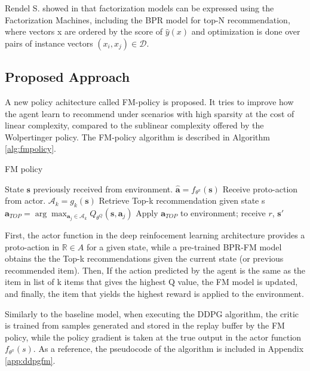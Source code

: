 Rendel S. showed in \cite{rendle2012factorization} that factorization models can be expressed using the Factorization Machines, including the BPR model for top-N recommendation, where vectors x are ordered by the score of $\hat{y}(x)$ and optimization is done over pairs of instance vectors $(x_i, x_j) \in \mathcal{D}$.

\subsection{Proposed Approach}

A new policy achitecture called FM-policy is proposed. It tries to improve how the agent learn to recommend under scenarios with high sparsity at the cost of linear complexity, compared to the sublinear complexity offered by the Wolpertinger policy. The FM-policy algorithm is described in Algorithm \ref{alg:fmpolicy}.

\begin{center}
 \begin{algorithm}[!htbp]
    \SetAlgoLined\DontPrintSemicolon
    \caption{FM policy}
    \label{alg:fmpolicy}
    
    State $\mathbf{s}$ previously received from environment.\;
    $\hat{\mathbf{a}} = f_{\theta^{\pi}}(\mathbf{s})$ {Receive proto-action from actor}.\;
    $\mathcal{A}_k = g_k(\mathbf{s})$ {Retrieve Top-k recommendation given state s}\;
    $\mathbf{a}_{TOP} = \arg \max_{\mathbf{a}_j \in \mathcal{A}_k} Q_{\theta^{Q}}(\mathbf{s}, \mathbf{a}_j)$\;
    Apply $\mathbf{a}_{TOP}$ to environment; receive $r$, $\mathbf{s}'$\;
  \end{algorithm}
\end{center}

First, the actor function in the deep reinfocement learning architecture provides a proto-action in $\mathbb{R} \in {A}$ for a given state, while a pre-trained BPR-FM model obtains the the Top-k recommendations given the current state (or previous recommended item). Then, If the action predicted by the agent is the same as the item in list of k items that gives the highest Q value, the FM model is updated, and finally, the item that yields the highest reward is applied to the environment.

Similarly to the baseline model, when executing the DDPG algorithm, the critic is trained from samples generated and stored in the replay buffer by the FM policy, while the policy gradient is taken at the true output in the actor function $f_{\theta^{\pi}}(s)$. As a reference, the pseudocode of the algorithm is included in Appendix \ref{app:ddpgfm}.
